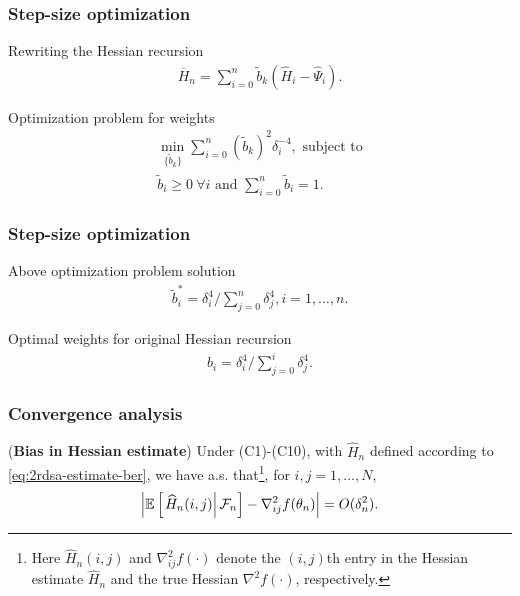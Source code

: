 \begin{frame}
\begin{small}
\frametitle{\centering Step-size optimization}
\begin{block}{Rewriting the Hessian recursion}
\begin{align}
\label{eq:hess}
\overline H_n = \sum\limits_{i=0}^{n} \tilde b_k(\widehat H_i -\widehat \Psi_i).
\end{align}
\end{block}
\begin{block}{Optimization problem for weights}
\begin{align}
\min_{ \{\tilde b_k\} } \sum \limits_{i=0}^{n} (\tilde b_k)^2 \delta_i^{-4}, \text{ subject to} \label{eq:wn-opt}\\
\tilde b_i \geq 0 ~\forall i \text{ and }\sum \limits_{i=0}^{n} \tilde b_i = 1.
\end{align}
\end{block}
\end{small}
\end{frame}

\begin{frame}
\begin{small}
\frametitle{\centering Step-size optimization}
\begin{block}{Above optimization problem solution}
\begin{align}
\tilde b_i^* = \delta_i^{4}/\sum \limits_{j=0}^{n} \delta_j^{4}, i=1,\ldots,n.
\end{align}
\end{block}
\begin{block}{Optimal weights for original Hessian recursion}
\begin{align}
\label{eq:wieghts}
b_i  = \delta_i^{4}/\sum\limits_{j=0}^{i} \delta_j^{4}.
\end{align}
\end{block}
\end{small}
\end{frame}

\begin{frame}
\begin{small}
\frametitle{\centering Convergence analysis}

\begin{lemma}(\textbf{Bias in Hessian estimate})
\label{lemma:2rdsa-bias}
Under (C1)-(C10), with $\widehat H_n$ defined according to \eqref{eq:2rdsa-estimate-ber}, we have a.s. that\footnote{Here $\widehat H_n(i,j)$ and $\nabla^2_{ij}f(\cdot)$ denote the $(i,j)$th entry in the Hessian estimate $\widehat H_n$ and the true Hessian $\nabla^2 f(\cdot)$, respectively.}, for $i,j = 1,\ldots,N$,
\begin{align}
\left|\mathbb{E}\left[
\left. \widehat H_n(i,j) \right| \mathcal{F}_n \right] - \nabla^2_{ij} f(\theta_n)\right| = O(\delta_n^2).
\end{align} 
\end{lemma}
\end{small}
\end{frame}


